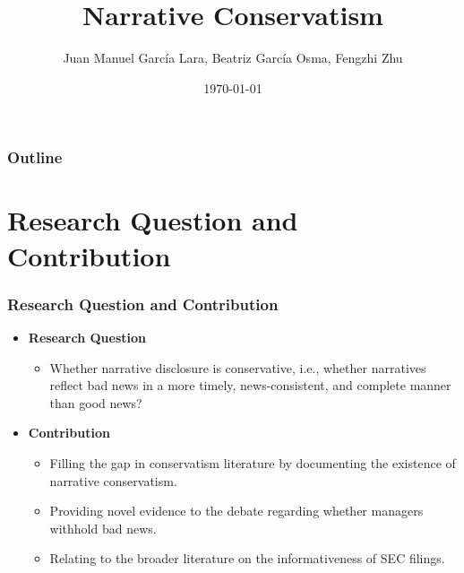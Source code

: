 \documentclass{beamer}
\title[Narrative Conservatism]{Narrative Conservatism} %
\author[]{Juan Manuel Garc\'ia Lara, Beatriz Garc\'ia Osma, Fengzhi Zhu} %
\institute[] %
{Universidad Carlos III de Madrid \\ %

	\medskip
	fzhu@emp.uc3m.es} %
\date{\today} %
\begin{document}
	
\begin{frame}
\titlepage %
\end{frame}

\begin{frame}
\frametitle{Outline}
\tableofcontents
\end{frame}

\section{Research Question and Contribution}

\begin{frame}
\frametitle{Research Question and Contribution}
\begin{itemize}
\item \textbf{Research Question}

\begin{itemize}
\item Whether narrative disclosure is conservative, i.e., whether narratives reflect bad news in a more timely, news-consistent, and complete manner than good news?
\end{itemize}

\item \textbf{Contribution}

\begin{itemize}
	\item Filling the gap in conservatism literature by documenting the existence of narrative conservatism.
	\item Providing novel evidence to the debate regarding whether managers withhold bad news. 
	\item Relating to the broader literature on the informativeness of SEC filings.
\end{itemize}
\end{itemize}
\end{frame}
\end{document}
